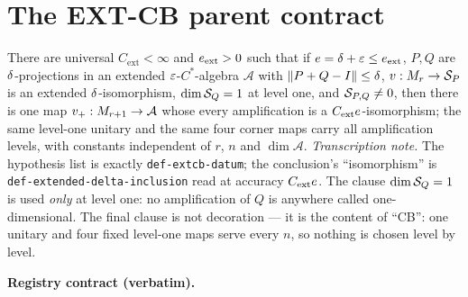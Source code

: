 \section{The EXT-CB parent contract}\label{sec:extcb}

\begin{lemma}\label{conj:extcb}
There are universal $C_{\mathrm{ext}}<\infty$ and $e_{\mathrm{ext}}>0$ such that if
$e=\delta+\varepsilon\le e_{\mathrm{ext}}$, $P,Q$ are $\delta$-projections in an extended
$\varepsilon$-$C^*$-algebra $\mathcal A$ with $\lVert P+Q-I\rVert\le\delta$, $v:M_{r}\to\mathcal S_{P}$ is an
extended $\delta$-isomorphism, $\dim\mathcal S_{Q}=1$ at level one, and $\mathcal S_{P,Q}\ne0$, then
there is one map $v_+:M_{r+1}\to\mathcal A$ whose every amplification is a
$C_{\mathrm{ext}}e$-isomorphism; the same level-one unitary and the same four corner
maps carry all amplification levels, with constants independent of $r$, $n$ and
$\dim\mathcal A$.
\emph{Transcription note.} The hypothesis list is exactly \texttt{def-extcb-datum}; the
conclusion's ``isomorphism'' is \texttt{def-extended-delta-inclusion} read at accuracy
$C_{\mathrm{ext}}e$. The clause $\dim\mathcal S_{Q}=1$ is used \emph{only} at level one: no
amplification of $Q$ is anywhere called one-dimensional. The final clause is not
decoration --- it is the content of ``CB'': one unitary and four fixed level-one maps serve
every $n$, so nothing is chosen level by level.
\end{lemma}

\noindent\textbf{Registry contract (verbatim).}

